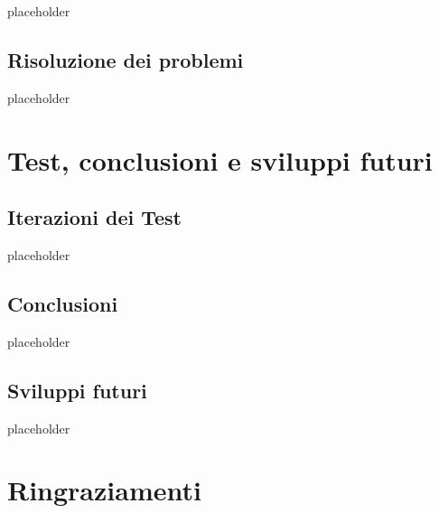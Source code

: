 \documentclass[a4paper,10pt]{memoir}
\begin{document}
placeholder

\clearpage

\section{Risoluzione dei problemi}

placeholder

\clearpage


\chapter{Test, conclusioni e sviluppi futuri}

\section{Iterazioni dei Test}

placeholder

\clearpage

\section{Conclusioni}

placeholder

\clearpage

\section{Sviluppi futuri}

placeholder

\clearpage


\chapter*{Ringraziamenti}

\cleardoublepage

\end{document}
